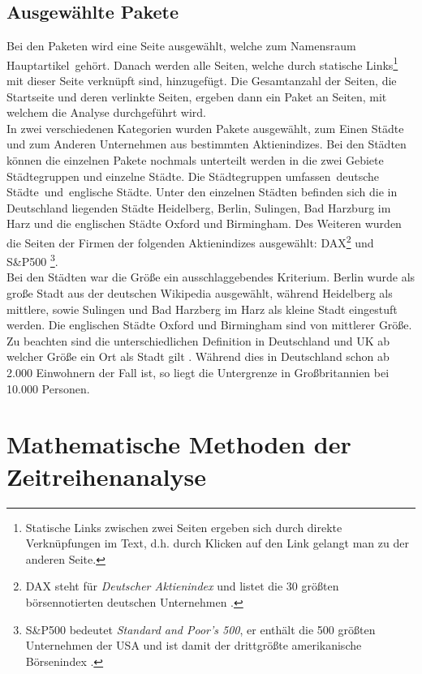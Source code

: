 \documentclass[fontsize=11pt, twoside, a4paper]{scrartcl}
\begin{document}
\subsection{Ausgewählte Pakete}
\label{sec:St1}
Bei den Paketen wird eine Seite ausgewählt, welche zum Namensraum \glqq Hauptartikel\grqq\, gehört. Danach werden alle Seiten, welche durch statische Links\footnote{Statische Links zwischen zwei Seiten ergeben sich durch direkte Verknüpfungen im Text, d.h. durch Klicken auf den Link gelangt man zu der anderen Seite.} mit dieser Seite verknüpft sind, hinzugefügt. Die Gesamtanzahl der Seiten, die Startseite und deren verlinkte Seiten, ergeben dann ein Paket an Seiten, mit welchem die Analyse durchgeführt wird.\\
In zwei verschiedenen Kategorien wurden Pakete ausgewählt, zum Einen Städte und zum Anderen Unternehmen aus bestimmten Aktienindizes. Bei den Städten können die einzelnen Pakete nochmals unterteilt werden in die zwei Gebiete Städtegruppen und einzelne Städte. Die Städtegruppen umfassen \,\glqq deutsche Städte\grqq\, und \,\glqq englische Städte\grqq. Unter den einzelnen Städten befinden sich die in Deutschland liegenden Städte Heidelberg, Berlin, Sulingen, Bad Harzburg im Harz und die englischen Städte Oxford und Birmingham. Des Weiteren wurden die Seiten der Firmen der folgenden Aktienindizes ausgewählt: DAX\footnote{DAX steht für \textit{Deutscher Aktienindex} und listet die 30 größten börsennotierten deutschen Unternehmen \cite{DAX}.} und S\&P500 \footnote{S\&P500 bedeutet \textit{Standard and Poor's 500}, er enthält die 500 größten Unternehmen der USA und ist damit der drittgrößte amerikanische Börsenindex \cite{SP500}.}. \\
Bei den Städten war die Größe ein ausschlaggebendes Kriterium. Berlin wurde als große Stadt aus der deutschen Wikipedia ausgewählt, während Heidelberg als mittlere, sowie Sulingen und Bad Harzberg im Harz als kleine Stadt eingestuft werden. Die englischen Städte Oxford und Birmingham sind von mittlerer Größe. Zu beachten sind die unterschiedlichen Definition in Deutschland und UK ab welcher Größe ein Ort als Stadt gilt \cite{Stadt}. Während dies in Deutschland schon ab 2.000 Einwohnern der Fall ist, so liegt die Untergrenze in Großbritannien bei 10.000 Personen.  

\section{Mathematische Methoden der Zeitreihenanalyse}
\end{document}
